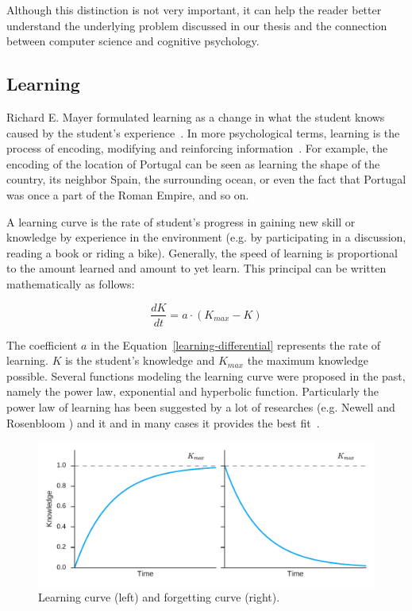 Although this distinction is not very important, it can help the reader better understand the underlying problem discussed in our thesis and the connection between computer science and cognitive psychology.

\subsection{Learning}
\label{learning}

Richard E. Mayer formulated learning as a change in what the student knows caused by the student's experience~\cite{RichardE.Mayer2010}. In more psychological terms, learning is the process of encoding, modifying and reinforcing information~\cite{Lewis}. For example, the encoding of the location of Portugal can be seen as learning the shape of the country, its neighbor Spain, the surrounding ocean, or even the fact that Portugal was once a part of the Roman Empire, and so on.

A learning curve is the rate of student's progress in gaining new skill or knowledge by experience in the environment (e.g. by participating in a discussion, reading a book or riding a bike). Generally, the speed of learning is proportional to the amount learned and amount to yet learn. This principal can be written mathematically as follows:

\begin{equation} \label{learning-differential}
  \frac{dK}{dt} = a \cdot (K_{max} - K)
\end{equation}

The coefficient $a$ in the Equation~\ref{learning-differential} represents the rate of learning. $K$ is the student's knowledge and $K_{max}$ the maximum knowledge possible. Several functions modeling the learning curve were proposed in the past, namely the power law, exponential and hyperbolic function. Particularly the power law of learning has been suggested by a lot of researches (e.g. Newell and Rosenbloom \cite{newell1981mechanisms}) and it and in many cases it provides the best fit~\cite{martin2011evaluating, koedinger2004distinguishing}.

\begin{figure}[htbp]
  \centering
  \includegraphics[width=\textwidth]{img/learning-forgetting-curves}
  \caption{Learning curve (left) and forgetting curve (right).}
  \label{fig:learning-forgetting-curves}
\end{figure}

